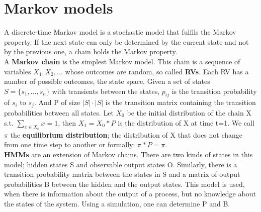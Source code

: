 \section{Markov models} 
\label{section:MM}
A discrete-time Markov model is a stochastic model that fulfils the Markov property. If the next state can only be determined by the current state and not by the previous one, a chain holds the Markov property.\\

A \textbf{Markov chain} is the simplest Markov model. This chain is a sequence of variables $X_1, X_2, ...$ whose outcomes are random, so called \textbf{\acp{RV}}. Each \ac{RV} has a number of possible outcomes, the state space. Given a set of states $S = \{s_1, ..., s_n\}$ with transients between the states, $p_{ij}$ is the transition probability of $s_i$ to $s_j$. And P of size $|S|\cdot|S|$ is the transition matrix containing the transition probabilities between all states.\newline
Let $X_0$ be the initial distribution of the chain X s.t. $\sum_{x \in X_0}{x} = 1$, then $X_1 = X_0 * P$ is the distribution of X at time t=1. We call $\pi$ the \textbf{equilibrium distribution}; the distribution of X that does not change from one time step to another or formally: $\pi * P = \pi$.\\
\textbf{\acp{HMM}} are an extension of Markov chains. There are two kinds of states in this model; hidden states S and observable output states O. Similarly, there is a transition probability matrix between the states in S and a matrix of output probabilities B between the hidden and the output states.\newline
This model is used, when there is information about the output of a process, but no knowledge about the states of the system. Using a simulation, one can determine P and B.\\

